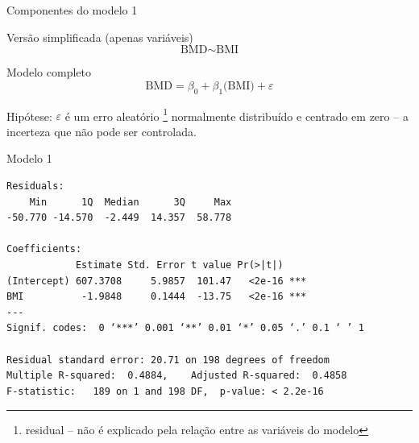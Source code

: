 \documentclass{beamer}
\begin{document}
\begin{frame}{\scriptsize Componentes do modelo 1}
  \begin{block}{\footnotesize Versão simplificada (apenas variáveis)}
    \footnotesize
    \begin{displaymath}
      \text{BMD} \sim \text{BMI}
    \end{displaymath}
  \end{block}
  \bigskip
  \bigskip
  \begin{block}{Modelo completo}
    \footnotesize
    \begin{displaymath}
      \text{BMD} =\beta_0 + \beta_1 \text{(BMI)} + \varepsilon
    \end{displaymath}
  \end{block}
  \vfill
  \footnotesize
  Hipótese: $\varepsilon$ é um erro aleatório \footnote{\scriptsize residual -- não é explicado pela relação entre as variáveis do modelo} normalmente distribuído e centrado em zero -- a incerteza que não pode ser controlada.
\end{frame}

\begin{frame}[fragile]{\scriptsize }
  \begin{center}
    \begin{exampleblock}{Modelo 1}
      \tiny
\begin{verbatim}
Residuals:
    Min      1Q  Median      3Q     Max 
-50.770 -14.570  -2.449  14.357  58.778 

Coefficients:
            Estimate Std. Error t value Pr(>|t|)    
(Intercept) 607.3708     5.9857  101.47   <2e-16 ***
BMI          -1.9848     0.1444  -13.75   <2e-16 ***
---
Signif. codes:  0 ‘***’ 0.001 ‘**’ 0.01 ‘*’ 0.05 ‘.’ 0.1 ‘ ’ 1

Residual standard error: 20.71 on 198 degrees of freedom
Multiple R-squared:  0.4884,	Adjusted R-squared:  0.4858 
F-statistic:   189 on 1 and 198 DF,  p-value: < 2.2e-16
\end{verbatim}
    \end{exampleblock}
  \end{center}
\end{frame}
\end{document}
